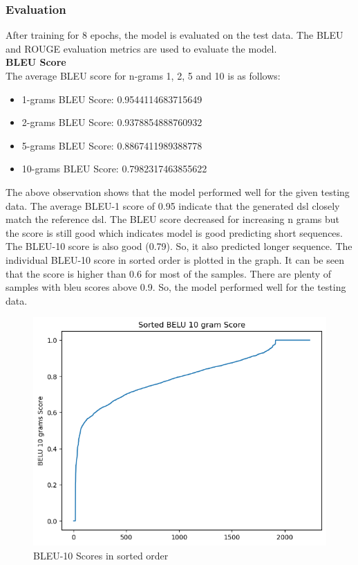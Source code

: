 \documentclass{ioereport}
\begin{document}
        \subsubsection{Evaluation}
        After training for 8 epochs, the model is evaluated on the test data. The BLEU and
ROUGE evaluation metrics are used to evaluate the model.\\
\textbf{BLEU Score}\\
The average BLEU score for n-grams 1, 2, 5 and 10 is as follows:
\begin{itemize}
    \item 1-grams BLEU Score: 0.9544114683715649
\item 2-grams BLEU Score: 0.9378854888760932
\item 5-grams BLEU Score: 0.8867411989388778
\item 10-grams BLEU Score: 0.7982317463855622
\end{itemize}
The above observation shows that the model performed well for the given testing data.
The average BLEU-1 score of 0.95 indicate that the generated \gls{dsl} closely match the
reference \gls{dsl}. The BLEU score decreased for increasing n grams but the score is still
good which indicates model is good predicting short sequences. The BLEU-10 score is
also good (0.79). So, it also predicted longer sequence.
The individual BLEU-10 score in sorted order is plotted in the graph. It can be seen that
the score is higher than 0.6 for most of the samples. There are plenty of samples with
bleu scores above 0.9. So, the model performed well for the testing data.
 \begin{figure}[H]
        \includegraphics[scale=.8]{images/bleu in sorted order.png}
        \caption{BLEU-10 Scores in sorted order}
        \label{fig:bleu10}
    \end{figure}
\end{document}
